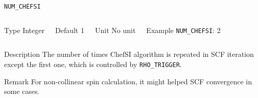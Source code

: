 \documentclass[xcolor=dvipsnames,t]{beamer}
\begin{document}
\begin{frame}[allowframebreaks]{\texttt{NUM\_CHEFSI}} \label{NUM_CHEFSI}
\vspace*{-12pt}
\begin{columns}
\begin{block}{Type}
Integer
\end{block}

\begin{block}{Default}
1
\end{block}

\begin{block}{Unit}
No unit
\end{block}

\begin{block}{Example}
\texttt{NUM\_CHEFSI}: 2
\end{block}
\end{columns}

\begin{block}{Description}
The number of times ChefSI algorithm is repeated in SCF iteration except the first one, which is controlled by \texttt{RHO\_TRIGGER}.
\end{block}

\begin{block}{Remark}
For non-collinear spin calculation, it might helped SCF convergence in some cases. 
\end{block}

\end{frame}
\end{document}

